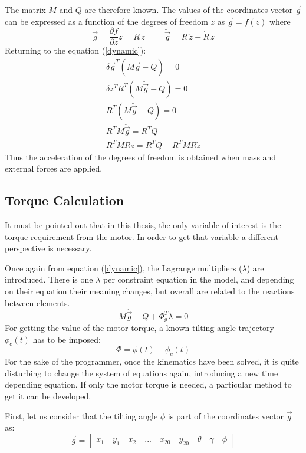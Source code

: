 The matrix $M$ and $Q$ are therefore known. The values of the coordinates vector $\vec{g}$ can be expressed as a function of the degrees of freedom $z$ as $\vec{g}=f(z)$ where \[\dot{\vec{g}}=\frac{\partial f}{\partial z}\dot{z}=R\,\dot{z} \hspace{1cm} \ddot{\vec{g}}=R\,\ddot{z}+\dot{R}\,\dot{z}\] Returning to the equation (\ref{dynamic}): 
\begin{eqnarray*}
\delta \vec{g}^{T}(M\ddot{\vec{g}}-Q)=0\\
\delta z^{T}R^{T}(M\ddot{\vec{g}}-Q)=0\\
R^{T}(M\ddot{\vec{g}}-Q)=0 \\
R^{T}M\ddot{\vec{g}}=R^{T}Q\\
R^{T}MR\ddot{z}=R^{T}Q-R^{T}M\dot{R}\dot{z}
\end{eqnarray*}
Thus the acceleration of the degrees of freedom is obtained when mass and external forces are applied. 

\subsection{Torque Calculation}

It must be pointed out that in this thesis, the only variable of interest is the torque requirement from the motor. In order to get that variable a different perspective is necessary. 

Once again from equation (\ref{dynamic}), the Lagrange multipliers ($\lambda$) are introduced. There is one $\lambda$ per constraint equation in the model, and depending on their equation their meaning changes, but overall are related to the reactions between elements. 
\begin{equation}
M\ddot{\vec{g}}-Q+\Phi_{g}^{T}\lambda=0 \label{lagrange}
\end{equation}
For getting the value of the motor torque, a known tilting angle trajectory $\phi_{c}(t)$  has to be imposed:\begin{equation}
\Phi=\phi(t)-\phi_{c}(t) \label{motor_torque}
\end{equation}
For the sake of the programmer, once the kinematics have been solved, it is quite disturbing to change the system of equations again, introducing a new time depending equation. If only the motor torque is needed, a particular method to get it can be developed.

First, let us consider that the tilting angle $\phi$ is part of the coordinates vector $\vec{g}$ as: \[\vec{g}=\begin{bmatrix}
x_{1}\quad y_{1}\quad x_{2}\quad ... \quad x_{20}\quad y_{20} \quad \theta \quad \gamma \quad \phi
\end{bmatrix}\]


